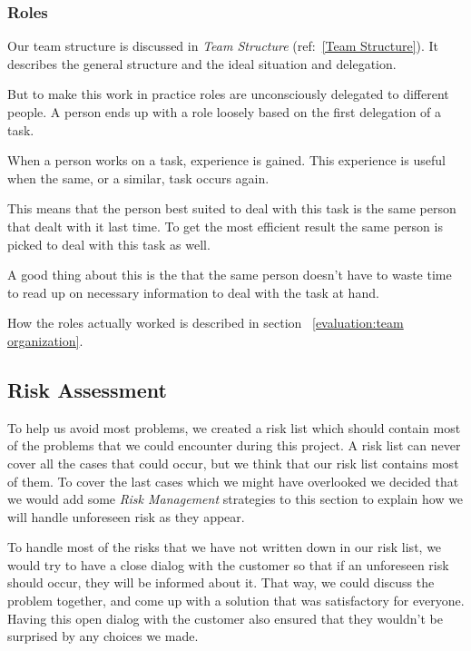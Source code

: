     \subsubsection{Roles}\label{roles}
    
    Our team structure is discussed in \textit{Team Structure} (ref:~\ref{Team Structure}). It describes the general structure and the ideal situation and delegation. 
    
    But to make this work in practice roles are unconsciously delegated to different people. A person ends up with a role loosely based on the first delegation of a task. 
    
    When a person works on a task, experience is gained. This experience is useful when the same, or a similar, task occurs again. 
    
    This means that the person best suited to deal with this task is the same person that dealt with it last time. To get the most efficient result the same person is picked to deal with this task as well. 

    A good thing about this is the that the same person doesn't have to waste time to read up on necessary information to deal with the task at hand.  
    
    How the roles actually worked is described in section ~\ref{evaluation:team organization}.
        
    \subsection{Risk Assessment}\label{Risk Assessment}
     To help us avoid most problems, we created a risk list which should contain most of the problems that we could encounter during this project. A risk list can never cover all the cases that could occur, but we think that our risk list contains most of them. To cover the last cases which we might have overlooked we decided that we would add some \textit{Risk Management} strategies to this section to explain how we will handle unforeseen risk as they appear. 
     
     To handle most of the risks that we have not written down in our risk list, we would try to have a close dialog with the customer so that if an unforeseen risk should occur, they will be informed about it. That way, we could discuss the problem together, and come up with a solution that was satisfactory for everyone. Having this open dialog with the customer also ensured that they wouldn't be surprised by any choices we made.
     
